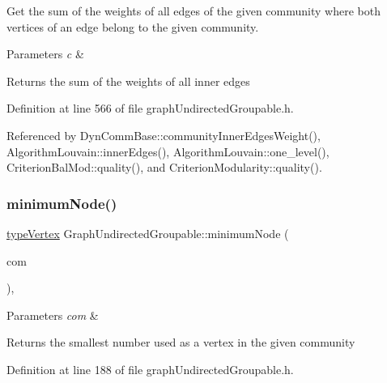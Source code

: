 Get the sum of the weights of all edges of the given community where both vertices of an edge belong to the given community.


\begin{DoxyParams}{Parameters}
{\em c} & \\
\hline
\end{DoxyParams}
\begin{DoxyReturn}{Returns}
the sum of the weights of all inner edges 
\end{DoxyReturn}


Definition at line 566 of file graph\+Undirected\+Groupable.\+h.



Referenced by Dyn\+Comm\+Base\+::community\+Inner\+Edges\+Weight(), Algorithm\+Louvain\+::inner\+Edges(), Algorithm\+Louvain\+::one\+\_\+level(), Criterion\+Bal\+Mod\+::quality(), and Criterion\+Modularity\+::quality().

\mbox{\label{classGraphUndirectedGroupable_a0ce165b4c68150f60ccd1977b83f3eb3}} 
\subsubsection{\texorpdfstring{minimum\+Node()}{minimumNode()}}
{\footnotesize\ttfamily \hyperlink{edge_8h_a5fbd20c46956d479cb10afc9855223f6}{type\+Vertex} Graph\+Undirected\+Groupable\+::minimum\+Node (\begin{DoxyParamCaption}\item[{const \hyperlink{graphUndirectedGroupable_8h_a914da95c9ea7f14f4b7f875c36818556}{type\+Community} \&}]{com }\end{DoxyParamCaption})\hspace{0.3cm}{\ttfamily [inline]}, {\ttfamily [private]}}


\begin{DoxyParams}{Parameters}
{\em com} & \\
\hline
\end{DoxyParams}
\begin{DoxyReturn}{Returns}
the smallest number used as a vertex in the given community 
\end{DoxyReturn}


Definition at line 188 of file graph\+Undirected\+Groupable.\+h.




